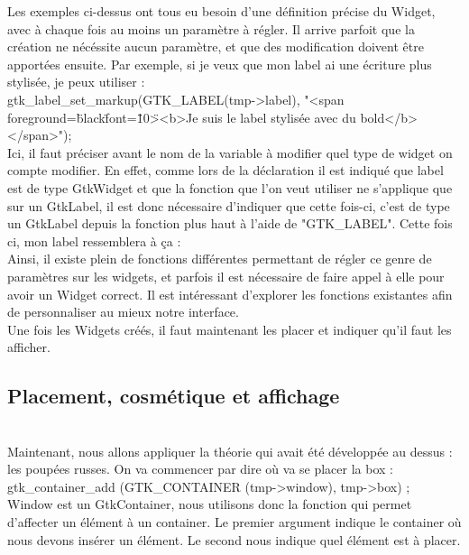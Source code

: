 \documentclass[11pt,french,a4paper]{report}
\begin{document}
Les exemples ci-dessus ont tous eu besoin d'une définition précise du Widget, avec à chaque fois au moins un paramètre à régler. Il arrive parfoit que la création
ne nécéssite aucun paramètre, et que des modification doivent être apportées ensuite. Par exemple, si je veux que mon label ai une écriture plus stylisée, je peux
utiliser :  \\
gtk\_label\_set\_markup(GTK\_LABEL(tmp->label), "<span foreground=\"black\" font=\"10\"><b>Je suis le label stylisée avec du bold</b></span>"); \\
Ici, il faut préciser avant le nom de la variable à modifier quel type de widget on compte modifier. En effet, comme lors de la déclaration 
il est indiqué que label est de type GtkWidget et que la fonction que l'on veut utiliser ne s'applique que sur un GtkLabel, il est 
donc nécessaire d'indiquer 
que cette fois-ci, c'est de type un GtkLabel depuis la fonction plus haut à l'aide de "GTK\_LABEL". 
Cette fois ci, mon label ressemblera à ça : 
\\
Ainsi, il existe plein de fonctions différentes permettant de régler ce genre de paramètres sur les widgets, et parfois il est nécessaire 
de faire appel à elle pour 
avoir un Widget correct. Il est intéressant d'explorer les fonctions existantes afin de personnaliser au mieux notre interface. \\

Une fois les Widgets créés, il faut maintenant les placer et indiquer qu'il faut les afficher. \\ 
 
\subsection{Placement, cosmétique et affichage} \\
Maintenant, nous allons appliquer la théorie qui avait été développée au dessus : les poupées russes. On va commencer par dire où 
va se placer la box : \\ 
 gtk\_container\_add (GTK\_CONTAINER (tmp->window), tmp->box) ; \\
Window est un GtkContainer, nous utilisons donc la fonction qui permet d'affecter un élément à un container. Le premier argument 
indique le container où nous
devons insérer un élément. Le second nous indique quel élément est à placer. \\
\end{document}
